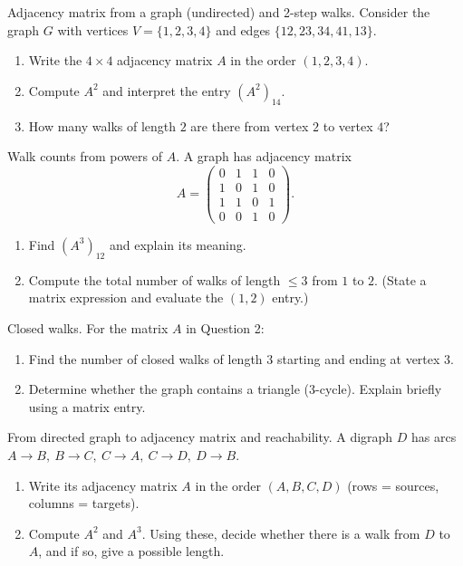 \documentclass[11pt]{article}
\def\textbf#1{#1}%
\newcounter{question}
\begin{document}
\begin{question}
\textbf{Adjacency matrix from a graph (undirected) and 2-step walks.}
Consider the graph \(G\) with vertices \(V=\{1,2,3,4\}\) and edges
\(\{12,23,34,41,13\}\).
\begin{enumerate}
  \item Write the \(4\times4\) adjacency matrix \(A\) in the order \((1,2,3,4)\).
  \item Compute \(A^{2}\) and interpret the entry \((A^{2})_{14}\).
  \item How many walks of length \(2\) are there from vertex \(2\) to vertex \(4\)?
\end{enumerate}
\end{question}

\begin{question}
\textbf{Walk counts from powers of \(A\).}
A graph has adjacency matrix
\[
A=\begin{pmatrix}
0&1&1&0\\
1&0&1&0\\
1&1&0&1\\
0&0&1&0
\end{pmatrix}.
\]
\begin{enumerate}
  \item Find \((A^{3})_{12}\) and explain its meaning.
  \item Compute the total number of walks of length \(\le 3\) from \(1\) to \(2\).
        (State a matrix expression and evaluate the \((1,2)\) entry.)
\end{enumerate}
\end{question}

\begin{question}
\textbf{Closed walks.}
For the matrix \(A\) in Question 2:
\begin{enumerate}
  \item Find the number of closed walks of length \(3\) starting and ending at vertex \(3\).
  \item Determine whether the graph contains a triangle (3-cycle). Explain briefly using a matrix entry.
\end{enumerate}
\end{question}

\begin{question}
\textbf{From directed graph to adjacency matrix and reachability.}
A digraph \(D\) has arcs \(A\to B,\ B\to C,\ C\to A,\ C\to D,\ D\to B\).
\begin{enumerate}
  \item Write its adjacency matrix \(A\) in the order \((A,B,C,D)\) (rows = sources, columns = targets).
  \item Compute \(A^{2}\) and \(A^{3}\). Using these, decide whether there is a walk from \(D\) to \(A\), and if so, give a possible length.
\end{enumerate}
\end{question}
\end{document}
